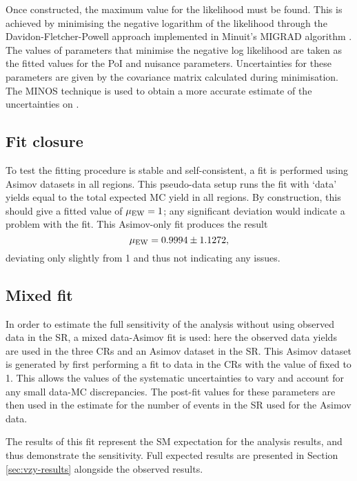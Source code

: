 Once constructed, the maximum value for the likelihood must be found. This is
achieved by minimising the negative logarithm of the likelihood through the
Davidon-Fletcher-Powell approach \cite{Davidon1959,Fletcher1970,Powell1983}
implemented in Minuit's MIGRAD algorithm \cite{Minuit2}.
The values of parameters that minimise the negative log likelihood are taken as
the fitted values for the \ac{PoI} and nuisance parameters. Uncertainties for
these parameters are given by the covariance matrix calculated during
minimisation. The MINOS technique \cite{Minuit2} is used to obtain a more
accurate estimate of the uncertainties on \muEW.

\subsection{Fit closure}

To test the fitting procedure is stable and self-consistent, a fit is performed
using Asimov datasets in all regions. This pseudo-data setup runs the fit with
`data' yields equal to the total expected \ac{MC} yield in all regions. By
construction, this should give a fitted value of $\mu_{\text{EW}} = 1$; any significant
deviation would indicate a problem with the fit. This Asimov-only fit produces
the result
%
\begin{equation*}
  \mu_{\text{EW}} = 0.9994 \pm 1.1272,
\end{equation*}
%
deviating only slightly from 1 and thus not indicating any issues.

\subsection{Mixed fit}

In order to estimate the full sensitivity of the analysis without using observed
data in the \ac{SR}, a mixed data-Asimov fit is used: here the observed data
yields are used in the three \acp{CR} and an Asimov dataset in the \ac{SR}. This
Asimov dataset is generated by first performing a fit to data in the \acp{CR}
with the value of \muEW fixed to 1. This allows the values of the systematic
uncertainties to vary and account for any small data-\ac{MC} discrepancies. The
post-fit values for these parameters are then used in the estimate for the
number of events in the \ac{SR} used for the Asimov data.

The results of this fit represent the \ac{SM} expectation for the analysis
results, and thus demonstrate the sensitivity. Full expected results are
presented in Section \ref{sec:vzy-results} alongside the observed results.

